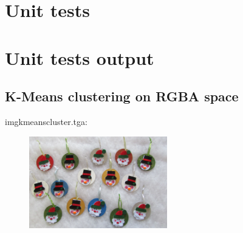 \begin{scriptsize}
\begin{ttfamily}

\end{ttfamily}
\end{scriptsize}

\section{Unit tests}

\begin{scriptsize}
\begin{ttfamily}

\end{ttfamily}
\end{scriptsize}

\section{Unit tests output}

\begin{scriptsize}
\begin{ttfamily}

\end{ttfamily}
\end{scriptsize}

\subsection{K-Means clustering on RGBA space}

imgkmeanscluster.tga:\\
\begin{center}
\begin{figure}[H]
\centering\includegraphics[width=6cm]{./imgkmeanscluster.png}\\
\end{figure}
\end{center}

